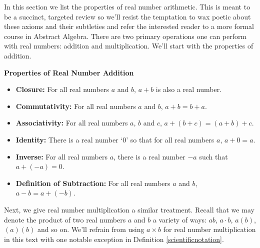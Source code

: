 

\setcounter{footnote}{0}

\label{AppRealNumberArithmetic}


In this section we list the properties of real number arithmetic.  This is meant to be a succinct, targeted review so we'll resist the temptation to wax poetic about these axioms and their subtleties and refer the interested reader to a more formal course in Abstract Algebra.  There are two primary operations one can perform with real numbers:  addition and multiplication.  We'll start with the properties of addition.

\medskip

\label{realnumberaddition}

\colorbox{ResultColor}{\bbm

\centerline{\textbf{Properties of Real Number Addition}}

\begin{itemize}

\item  \textbf{Closure:}  For all real numbers $a$ and $b$,  $a+b$ is also a real number.

\item  \textbf{Commutativity:}  For all real numbers $a$ and $b$, $a+b = b+a$.

\item  \textbf{Associativity:}  For all real numbers $a$, $b$ and $c$, $a+(b+c) = (a+b)+c$.

\item  \textbf{Identity:}  There is a real number `$0$' so that for all real numbers $a$, $a+0 = a$.

\item  \textbf{Inverse:}  For all real numbers $a$, there is a real number $-a$ such that $a + (-a) = 0$.

\item \textbf{Definition of Subtraction:}  For all real numbers $a$ and $b$, $a - b = a + (-b)$.

\end{itemize}

\ebm}

\medskip

Next, we give real number multiplication a similar treatment.  Recall that we may denote the product of two real numbers $a$ and $b$ a variety of ways:  $ab$, $a \cdot b$, $a(b)$, $(a)(b)$ and so on.  We'll refrain from using $a \times b$ for real number multiplication in this text with one notable exception in Definition \ref{scientificnotation}.

